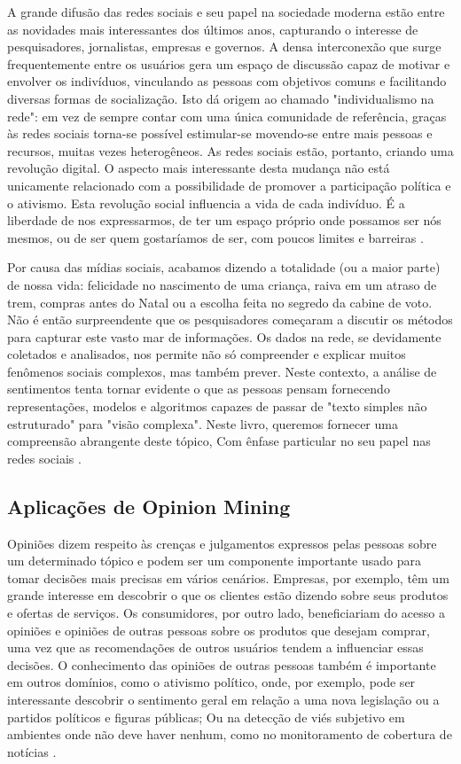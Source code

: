 \documentclass[
	12pt,				%
	openright,			%
	oneside,			%
	a4paper,			%
	english,			%
	spanish,			%
	brazil				%
	]{abntex2}
\begin{document}
A grande difusão das redes sociais e seu papel na sociedade moderna estão entre as novidades mais interessantes dos últimos anos, capturando o interesse de pesquisadores, jornalistas, empresas e governos. A densa interconexão que surge frequentemente entre os usuários gera um espaço de discussão capaz de motivar e envolver os indivíduos, vinculando as pessoas com objetivos comuns e facilitando diversas formas de socialização. Isto dá origem ao chamado "individualismo na rede": em vez de sempre contar com uma única comunidade de referência, graças às redes sociais torna-se possível estimular-se movendo-se entre mais pessoas e recursos, muitas vezes heterogêneos. As redes sociais estão, portanto, criando uma revolução digital. O aspecto mais interessante desta mudança não está unicamente relacionado com a possibilidade de promover a participação política e o ativismo. Esta revolução social influencia a vida de cada indivíduo. É a liberdade de nos expressarmos, de ter um espaço próprio onde possamos ser nós mesmos, ou de ser quem gostaríamos de ser, com poucos limites e barreiras \cite{book_sentiment_social}.

Por causa das mídias sociais, acabamos dizendo a totalidade (ou a maior parte) de nossa vida: felicidade no nascimento de uma criança, raiva em um atraso de trem, compras antes do Natal ou a escolha feita no segredo da cabine de voto. Não é então surpreendente que os pesquisadores começaram a discutir os métodos para capturar este vasto mar de informações. Os dados na rede, se devidamente coletados e analisados, nos permite não só compreender e explicar muitos fenômenos sociais complexos, mas também prever. Neste contexto, a análise de sentimentos tenta tornar evidente o que as pessoas pensam fornecendo representações, modelos e algoritmos capazes de passar de "texto simples não estruturado" para "visão complexa". Neste livro, queremos fornecer uma compreensão abrangente deste tópico, Com ênfase particular no seu papel nas redes sociais \cite{book_sentiment_social}.

	\subsection*{Aplicações de Opinion Mining}
	
	Opiniões dizem respeito às crenças e julgamentos expressos pelas pessoas sobre um determinado tópico e podem ser um componente importante usado para tomar decisões mais precisas em vários cenários\cite{book_discover_practices}. Empresas, por exemplo, têm um grande interesse em descobrir o que os clientes estão dizendo sobre seus produtos e ofertas de serviços. Os consumidores, por outro lado, beneficiariam do acesso a opiniões e opiniões de outras pessoas sobre os produtos que desejam comprar, uma vez que as recomendações de outros usuários tendem a influenciar essas decisões. O conhecimento das opiniões de outras pessoas também é importante em outros domínios, como o ativismo político, onde, por exemplo, pode ser interessante descobrir o sentimento geral em relação a uma nova legislação ou a partidos políticos e figuras públicas\cite{book_political_opinion}; Ou na detecção de viés subjetivo em ambientes onde não deve haver nenhum, como no monitoramento de cobertura de notícias \cite{book_Cambria2015}.
\end{document}
